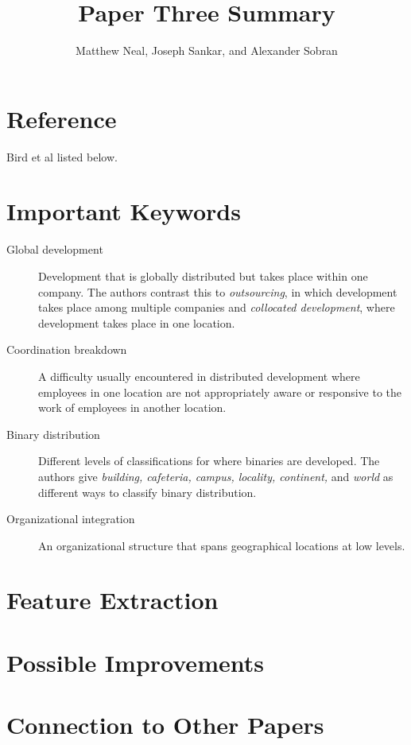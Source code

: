 \documentclass[english]{article}
\begin{document}
\title{Paper Three Summary}


\author{Matthew Neal, Joseph Sankar, and Alexander Sobran}

\maketitle

\section*{Reference}

Bird et al \cite{bird09} listed below.


\section*{Important Keywords}
\begin{description}
\item [{Global development}] Development that is globally distributed but takes place within one company. The authors contrast this to \emph{outsourcing}, in which development takes place among multiple companies and \emph{collocated development}, where development takes place in one location. 
\item [{Coordination breakdown}] A difficulty usually encountered in distributed development where employees in one location are not appropriately aware or responsive to the work of employees in another location.
\item [{Binary distribution}] Different levels of classifications for where binaries are developed. The authors give \emph{building, cafeteria, campus, locality, continent, } and \emph{world} as different ways to classify binary distribution.
\item [{Organizational integration}] An organizational structure that spans geographical locations at low levels.
\end{description}

\section*{Feature Extraction}

\section*{Possible Improvements}

\section*{Connection to Other Papers}




\end{document}
